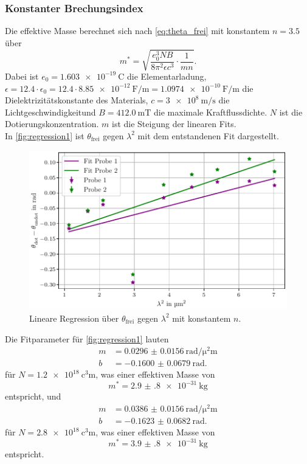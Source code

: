 \subsubsection{Konstanter Brechungsindex}
Die effektive Masse berechnet sich nach \autoref{eq:theta_frei} mit konstantem $n = \num{3,5}$ über
\begin{equation}
    m^* = \sqrt{\frac{e_0^3 N B}{8 \pi^2 \epsilon c^3} \cdot \frac{1}{mn}}.
\label{eq:masse}
\end{equation}
Dabei ist $e_0 = \qty{1.603e-19}{\coulomb}$ die Elementarladung, $\epsilon = \num{12.4} \cdot \epsilon_0 = \num{12.4} \cdot \qty{8.85e-12}{\farad\per\meter} = \qty{1.0974e-10}{\farad\per\meter}$ die Dielektrizitätskonstante des Materials,
$c= \qty{3e8}{\meter\per\second}$ die Lichtgeschwindigkeitund $B= \qty{412.0}{\milli\tesla}$ die maximale Kraftflussdichte. $N$ ist die Dotierungskonzentration. $m$ ist die Steigung der linearen Fits.\\
In \autoref{fig:regression1} ist $\theta_\text{frei}$ gegen $\lambda^2$ mit dem entstandenen Fit dargestellt.
\begin{figure}
    \centering
    \includegraphics[width=\textwidth]{plots/fits_ohne_n.pdf}
    \caption{Lineare Regression über $\theta_\text{frei}$ gegen $\lambda^2$ mit konstantem $n$.}
    \label{fig:regression1}
\end{figure}
Die Fitparameter für \autoref{fig:regression1} lauten
\begin{align*}
    m &= \qty{0.0296(156)}{\radian\per\square\micro\meter} \\
    b &= \qty{-0.1600(679)}{\radian}.
\end{align*}
für $N = \qty{1.2e18}{\cubic\centi\meter}$, was einer effektiven Masse von
\begin{equation*}
    m^* = \qty{2.9(8)e-31}{\kilo\gram}
\end{equation*}
entspricht, und
\begin{align*}
    m &= \qty{0.0386(156)}{\radian\per\square\micro\meter} \\
    b &= \qty{-0.1623(682)}{\radian}.
\end{align*}
für $N = \qty{2.8e18}{\cubic\centi\meter}$, was einer effektiven Masse von
\begin{equation*}
    m^* = \qty{3.9(8)e-31}{\kilo\gram}
\end{equation*} 
entspricht.


